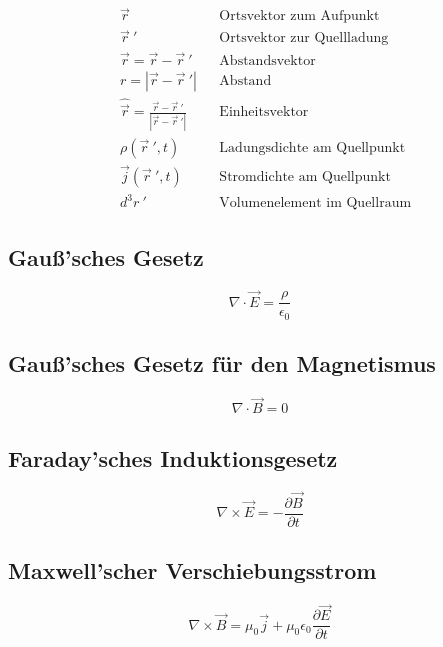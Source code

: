 \begin{align*}
&\vec{r} && \text{Ortsvektor zum Aufpunkt} \\
&\vec{r}~' && \text{Ortsvektor zur Quellladung} \\
&\vec{r} = \vec{r} - \vec{r}~' && \text{Abstandsvektor} \\
&r = |\vec{r} - \vec{r}~'| && \text{Abstand} \\
&\hat{\vec{r}} = \frac{\vec{r} - \vec{r}~'}{|\vec{r} - \vec{r}~'|} && \text{Einheitsvektor} \\
&\rho(\vec{r}~', t) && \text{Ladungsdichte am Quellpunkt} \\
&\vec{j}(\vec{r}~', t) && \text{Stromdichte am Quellpunkt} \\
&d^3r~' && \text{Volumenelement im Quellraum}
\end{align*}

\subsection{Gauß'sches Gesetz}
\begin{equation}
    \nabla \cdot \vec{E} = \frac{\rho}{\epsilon_0}
\end{equation}

\subsection{Gauß'sches Gesetz für den Magnetismus}
\begin{equation}
    \nabla \cdot \vec{B} = 0
\end{equation}

\subsection{Faraday'sches Induktionsgesetz}
\begin{equation}
    \nabla \times \vec{E} = -\frac{\partial \vec{B}}{\partial t}
\end{equation}

\subsection{Maxwell'scher Verschiebungsstrom}
\begin{equation}
    \nabla \times \vec{B} = \mu_0 \vec{j} + \mu_0 \epsilon_0 \frac{\partial \vec{E}}{\partial t}
\end{equation}

